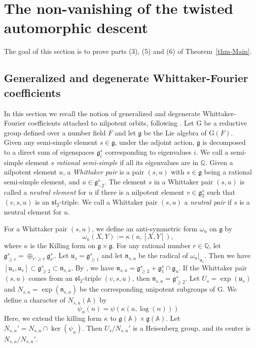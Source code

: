 \documentclass[12pt]{amsart}
\newcommand{\A}{\mathbb{A}}
\newcommand{\RG}{{\mathrm {G}}}
\theoremstyle{remark}
\begin{document}
\section{The non-vanishing of the twisted automorphic descent}
\label{section-non-vanishing}
The goal of this section is to prove parts (3), (5) and (6) of Theorem~\ref{thm-Main}.
 

\subsection{Generalized and degenerate Whittaker-Fourier coefficients}

In this section we recall the notion of generalized and degenerate Whittaker-Fourier coefficients attached to nilpotent orbits, following \cite{GomezGourevitchSahi2017}.
Let $\RG$ be a reductive group defined over a number field $F$ and let $\mathfrak{g}$ be the Lie algebra of $\RG(F)$.
Given any semi-simple element $s \in \mathfrak{g}$, under the adjoint action, $\mathfrak{g}$ is decomposed to a direct sum of eigenspaces $\mathfrak{g}^s_i$ corresponding to eigenvalues $i$.
We call a semi-simple element
$s$ {\it rational semi-simple} if all its eigenvalues are in $\mathbb{Q}$.
Given a nilpotent element $u$, a {\it Whittaker pair} is a pair $(s,u)$ with $s \in \mathfrak{g}$ being a rational semi-simple element, and $u \in \mathfrak{g}^s_{-2}$. The element $s$ in a Whittaker pair $(s, u)$ is called a {\it neutral element} for $u$ if there is a nilpotent element $v \in \mathfrak{g}^{s}_{2}$ such that $(v,s,u)$ is an $\mathfrak{sl}_2$-triple. 
We call a Whittaker pair $(s,u)$ a {\it neutral pair} if $s$ is a neutral element for $u$.

For a Whittaker pair $(s,u)$, we define an anti-symmetric form $\omega_{u}$ on $\mathfrak{g}$ by 
\begin{equation*}
\omega_{u}(X, Y):=\kappa(u, [X, Y]),
\end{equation*}
where $\kappa$ is the Killing form on $\mathfrak{g}\times \mathfrak{g}$. For any rational number $r\in \mathbb{Q}$, let $\mathfrak{g}^s_{\geq r} = \oplus_{r' \geq r} \mathfrak{g}^s_{r'}$.
Let $\mathfrak{u}_s= \mathfrak{g}^s_{\geq 1}$ and let $\mathfrak{n}_{s,u}$ be the radical of $\omega_u |_{\mathfrak{u}_s}$. Then we have $[\mathfrak{u}_s, \mathfrak{u}_s] \subset \mathfrak{g}^s_{\geq 2} \subset \mathfrak{n}_{s,u}$. By \cite[Lemma 3.2.6]{GomezGourevitchSahi2017}, we have $\mathfrak{n}_{s,u} = \mathfrak{g}^s_{\geq 2} + \mathfrak{g}^s_1 \cap \mathfrak{g}_u$.
If the Whittaker pair $(s,u)$ comes from an $\mathfrak{sl}_2$-triple $(v,s,u)$, then $\mathfrak{n}_{s,u}=\mathfrak{g}^s_{\geq 2}$. Let $U_{s}=\exp(\mathfrak{u}_s)$ and $N_{s,u}=\exp(\mathfrak{n}_{s,u})$ be the corresponding unipotent subgroups of $\RG$. We define a character of $N_{s,u}(\A)$ by
\begin{equation}
\label{eq-GGS-char}
\psi_u(n)=\psi(\kappa(u,\log(n)))	
\end{equation}
Here, we extend the killing form $\kappa$ to $\mathfrak{g}(\A)\times\mathfrak{g}(\A)$. 
 Let $N_{s,u}' = N_{s,u} \cap \ker (\psi_u)$. Then $U_s/N_{s,u}'$ is a Heisenberg group, and its center  is $N_{s,u}/N_{s,u}'$.
\end{document}
